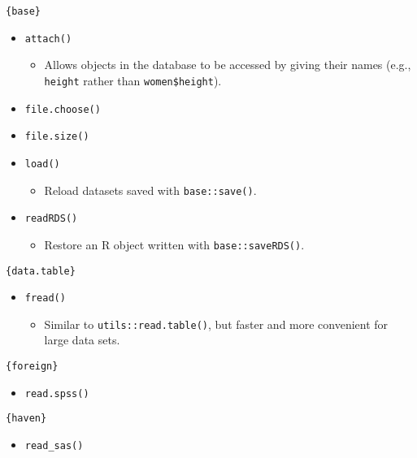 \documentclass[
]{book}
\providecommand{\tightlist}{%
  \setlength{\itemsep}{0pt}\setlength{\parskip}{0pt}}
\begin{document}
\texttt{\{base\}}

\begin{itemize}
\tightlist
\item
  \texttt{attach()}

  \begin{itemize}
  \tightlist
  \item
    Allows objects in the database to be accessed by giving their names (e.g., \texttt{height} rather than \texttt{women\$height}).
  \end{itemize}
\item
  \texttt{file.choose()}
\item
  \texttt{file.size()}
\item
  \texttt{load()}

  \begin{itemize}
  \tightlist
  \item
    Reload datasets saved with \texttt{base::save()}.
  \end{itemize}
\item
  \texttt{readRDS()}

  \begin{itemize}
  \tightlist
  \item
    Restore an R object written with \texttt{base::saveRDS()}.
  \end{itemize}
\end{itemize}

\texttt{\{data.table\}}

\begin{itemize}
\tightlist
\item
  \texttt{fread()}

  \begin{itemize}
  \tightlist
  \item
    Similar to \texttt{utils::read.table()}, but faster and more convenient for large data sets.
  \end{itemize}
\end{itemize}

\texttt{\{foreign\}}

\begin{itemize}
\tightlist
\item
  \texttt{read.spss()}
\end{itemize}

\texttt{\{haven\}}

\begin{itemize}
\tightlist
\item
  \texttt{read\_sas()}
\end{itemize}
\end{document}
